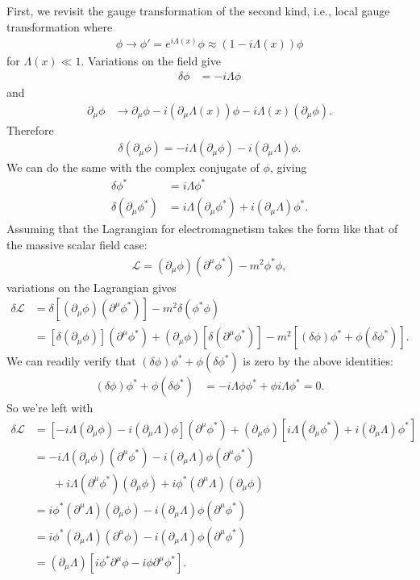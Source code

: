 \documentclass{book}
\numberwithin{equation}{section}
\theoremstyle{definition}
\newcommand{\p}{\partial}
\newcommand{\lag}{\mathcal{L}}
\begin{document}
First, we revisit the gauge transformation of the second kind, i.e., local gauge transformation where
\begin{align}
\phi \to \phi' = e^{i\Lambda(x)}\phi \approx (1-i\Lambda(x))\phi
\end{align}
for $\Lambda(x) \ll 1$. Variations on the field give
\begin{align}
\delta \phi &= -i\Lambda \phi
\end{align}
and
\begin{align}
\p_\mu \phi &\to \p_\mu \phi - i(\p_\mu\Lambda(x))\phi - i\Lambda(x)(\p_\mu \phi).
\end{align}
Therefore
\begin{align}
\delta(\p_\mu\phi) = -i\Lambda(\p_\mu\phi) - i(\p_\mu\Lambda)\phi.
\end{align}
We can do the same with the complex conjugate of $\phi$, giving
\begin{align}
\delta \phi^* &= i\Lambda \phi^*\\
\delta(\p_\mu\phi^*) &= i\Lambda(\p_\mu\phi^*) +  i(\p_\mu\Lambda)\phi^*.
\end{align}
Assuming that the Lagrangian for electromagnetism takes the form like that of the massive scalar field case:
\begin{align}
\lag = (\p_\mu\phi)(\p^\mu\phi^*) - m^2\phi^*\phi,
\end{align}
variations on the Lagrangian gives
\begin{align}
\delta \lag &= \delta[(\p_\mu\phi)(\p^\mu\phi^*)] - m^2 \delta(\phi^*\phi)\\
&= [\delta(\p_\mu\phi)](\p^\mu\phi^*) + (\p_\mu\phi)[\delta(\p^\mu\phi^*)] - m^2[(\delta \phi)\phi^* + \phi(\delta \phi^*)].
\end{align}
We can readily verify that $(\delta \phi)\phi^* + \phi(\delta \phi^*)$ is zero by the above identities:
\begin{align}
(\delta \phi)\phi^* + \phi(\delta \phi^*)&= -i\Lambda \phi \phi^* + \phi i\Lambda \phi^* = 0.
\end{align}
So we're left with
\begin{align}
\delta \lag&= [-i\Lambda(\p_\mu\phi) - i(\p_\mu\Lambda)\phi](\p^\mu\phi^*) + (\p_\mu\phi)[i\Lambda(\p_\mu\phi^*) +  i(\p_\mu\Lambda)\phi^*]\\
&= -i\Lambda(\p_\mu\phi)(\p^\mu\phi^*) - i(\p_\mu\Lambda)\phi (\p^\mu\phi^*)\\ 
&\,\,\,\,\,\,\,\,\,\,+ i\Lambda (\p^\mu\phi^*)(\p_\mu\phi) + i\phi^*(\p^\mu\Lambda)(\p_\mu\phi)\\
&= i\phi^*(\p^\mu\Lambda)(\p_\mu\phi) - i(\p_\mu\Lambda)\phi (\p^\mu\phi^*)\\
&= i\phi^*(\p_\mu\Lambda)(\p^\mu\phi) - i(\p_\mu\Lambda)\phi (\p^\mu\phi^*)\\
&= (\p_\mu\Lambda)[i\phi^*\p^\mu\phi - i\phi\p^\mu\phi^*].
\end{align}
\end{document}
